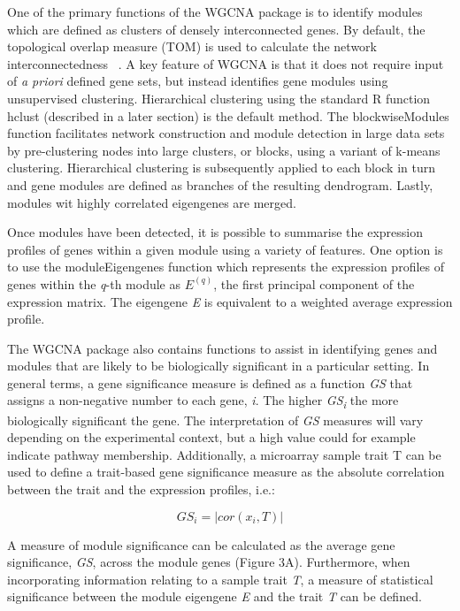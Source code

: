 One of the primary functions of the WGCNA package is to identify modules which are defined as clusters of densely interconnected genes. By default, the topological overlap measure (TOM) is used to calculate the network interconnectedness ~\autocite{Zha2005}. A key feature of WGCNA is that it does not require input of  \textit{a priori} defined gene sets, but instead identifies gene modules using unsupervised clustering. Hierarchical clustering using the standard R function hclust (described in a later section) is the default method. The blockwiseModules function facilitates network construction and module detection in large data sets by pre-clustering nodes into large clusters, or blocks, using a variant of k-means clustering. Hierarchical clustering is subsequently applied to each block in turn and gene modules are defined as branches of the resulting dendrogram. Lastly, modules wit highly correlated eigengenes are merged. 

Once modules have been detected, it is possible to summarise the expression profiles of genes within a given module using a variety of features. One option is to use the moduleEigengenes function which represents the expression profiles of genes within the \textit{q}-th module as \textit{$E^(q)$}, the first principal component of the expression matrix. The eigengene \textit{E} is equivalent to a weighted average expression profile.


The WGCNA package also contains functions to assist in identifying genes and modules that are likely to be biologically significant in a particular setting. In general terms, a gene significance measure is defined as a function \textit{GS} that assigns a non-negative number to each gene, \textit{i}. The higher \textit{GS\textsubscript{i}} the more biologically significant the gene. The interpretation of \textit{GS} measures will vary depending on the experimental context, but a high value could for example indicate pathway membership. Additionally, a microarray sample trait T can be used to define a trait-based gene significance measure as the absolute correlation between the trait and the expression profiles, i.e.:

\begin{equation}
    GS_{i} = |cor(x_i, T)|
\end{equation}


A measure of module significance can be calculated as the average gene significance, \textit{GS}, across the module genes (Figure 3A). Furthermore, when incorporating information relating to a sample trait \textit{T}, a measure of statistical significance between the module eigengene \textit{E} and the trait \textit{T} can be defined.

